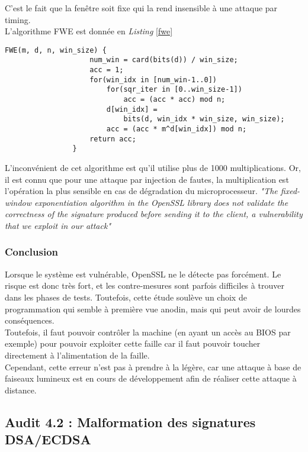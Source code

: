 			C'est le fait que la fenêtre soit fixe qui la rend insensible à une attaque par timing.\\

			L'algorithme FWE est donnée en \textit{Listing} \ref{fwe}
		
			\begin{lstlisting}[style=customc,caption=fwe.c, label=fwe]
				FWE(m, d, n, win_size) {
					num_win = card(bits(d)) / win_size;
					acc = 1;
					for(win_idx in [num_win-1..0])
						for(sqr_iter in [0..win_size-1])
							acc = (acc * acc) mod n;
						d[win_idx] =
							bits(d, win_idx * win_size, win_size);
						acc = (acc * m^d[win_idx]) mod n;
					return acc;
				}
			\end{lstlisting}
		

			L'inconvénient de cet algorithme est qu'il utilise plus de 1000 multiplications. Or, il est connu que pour une attaque par injection de fautes, la multiplication est l'opération la plus sensible en cas de dégradation du microprocesseur. \textit{"The fixed-window exponentiation algorithm in the OpenSSL library does not validate the correctness of the signature produced before sending it to the client, a vulnerability that we exploit in our attack"}\\
			

		\subsubsection{Conclusion}

			Lorsque le système est vulnérable, OpenSSL ne le détecte pas forcément. Le risque est donc très fort, et les contre-mesures sont parfois difficiles à trouver dans les phases de tests. Toutefois, cette étude soulève un choix de programmation qui semble à première vue anodin, mais qui peut avoir de lourdes conséquences.\\

			Toutefois, il faut pouvoir contrôler la machine (en ayant un accès au BIOS par exemple) pour pouvoir exploiter cette faille car il faut pouvoir toucher directement à l'alimentation de la faille.\\

			Cependant, cette erreur n'est pas à prendre à la légère, car une attaque à base de faiseaux lumineux est en cours de développement afin de réaliser cette attaque à distance.
		
\subsection{Audit 4.2 : Malformation des signatures DSA/ECDSA}
